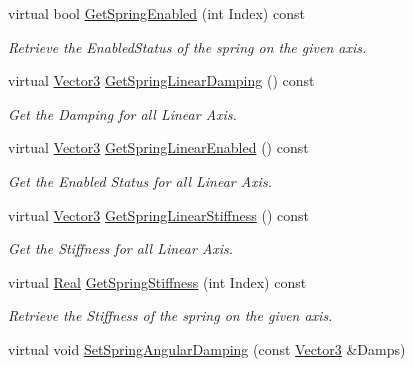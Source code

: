 \begin{DoxyCompactItemize}
virtual bool \hyperlink{classMezzanine_1_1Generic6DofSpringConstraint_aad97ef152f3917c5156e86576a163e7a}{GetSpringEnabled} (int Index) const 
\begin{DoxyCompactList}\small\item\em Retrieve the EnabledStatus of the spring on the given axis. \item\end{DoxyCompactList}\item 
virtual \hyperlink{classMezzanine_1_1Vector3}{Vector3} \hyperlink{classMezzanine_1_1Generic6DofSpringConstraint_aebffea969499acf9887b1be3c1f43204}{GetSpringLinearDamping} () const 
\begin{DoxyCompactList}\small\item\em Get the Damping for all Linear Axis. \item\end{DoxyCompactList}\item 
virtual \hyperlink{classMezzanine_1_1Vector3}{Vector3} \hyperlink{classMezzanine_1_1Generic6DofSpringConstraint_abd30a7c9b647f2f64f55f7edefdb1775}{GetSpringLinearEnabled} () const 
\begin{DoxyCompactList}\small\item\em Get the Enabled Status for all Linear Axis. \item\end{DoxyCompactList}\item 
virtual \hyperlink{classMezzanine_1_1Vector3}{Vector3} \hyperlink{classMezzanine_1_1Generic6DofSpringConstraint_a251631fcc79aa186b3ceb498f293ce84}{GetSpringLinearStiffness} () const 
\begin{DoxyCompactList}\small\item\em Get the Stiffness for all Linear Axis. \item\end{DoxyCompactList}\item 
virtual \hyperlink{namespaceMezzanine_a726731b1a7df72bf3583e4a97282c6f6}{Real} \hyperlink{classMezzanine_1_1Generic6DofSpringConstraint_adf49b712b19dfa18bfccc643871db30e}{GetSpringStiffness} (int Index) const 
\begin{DoxyCompactList}\small\item\em Retrieve the Stiffness of the spring on the given axis. \item\end{DoxyCompactList}\item 
virtual void \hyperlink{classMezzanine_1_1Generic6DofSpringConstraint_a7a0c52e6bbed9f58e4385ce2e1edff4c}{SetSpringAngularDamping} (const \hyperlink{classMezzanine_1_1Vector3}{Vector3} \&Damps)

\end{DoxyCompactItemize}
